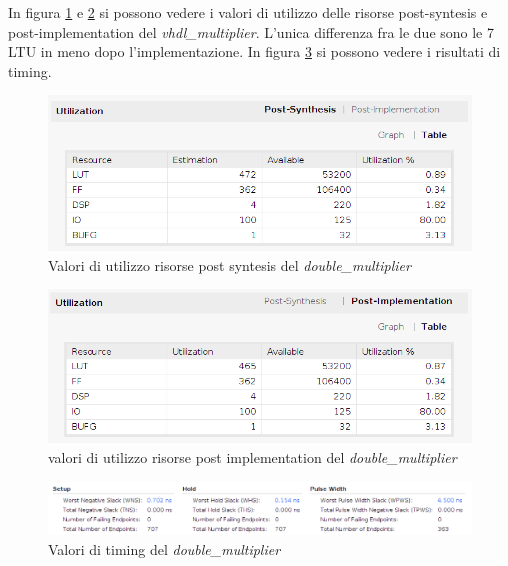 \documentclass[]{IEEEtran}
\begin{document}
In figura \ref{fig:UTIL_SYNT_DM} e \ref{fig:UTIL_IMPL_DM} si possono vedere i valori di utilizzo delle risorse post-syntesis e post-implementation del \textit{vhdl\_multiplier}. L'unica differenza fra le due sono le 7 LTU in meno dopo l'implementazione. In figura \ref{fig:TIMING_DM} si possono vedere i risultati di timing.
\begin{figure}[!htb]
    \centering
    \includegraphics[width=0.9\linewidth]{figures/util_synt_dm}
    \caption{Valori di utilizzo risorse post syntesis del \textit{double\_multiplier}}
    \label{fig:UTIL_SYNT_DM}
\end{figure}
\begin{figure}[!htb]
    \centering
    \includegraphics[width=0.9\linewidth]{figures/util_impl_dm}
    \caption{valori di utilizzo risorse post implementation del \textit{double\_multiplier}}
    \label{fig:UTIL_IMPL_DM}
\end{figure}
\begin{figure}[!htb]
    \centering
    \includegraphics[width=0.9\linewidth]{figures/timing_dm}
    \caption{Valori di timing del \textit{double\_multiplier}}
    \label{fig:TIMING_DM}
\end{figure}
\end{document}
